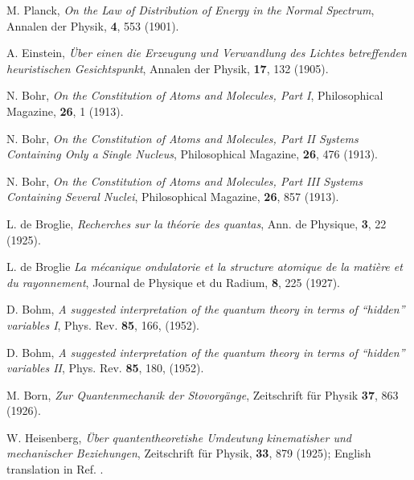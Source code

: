 \documentclass[onecolumn,nofootinbib, secnumarabic, amsmath, nobibnotes,11pt,aps,pra]{revtex4-1}
\begin{document}
\setcounter{enumiv}{0}
\begin{thebibliography}{999}

M. Planck, \emph{On the Law of Distribution of Energy in the Normal Spectrum}, Annalen der Physik, \textbf{4},   553 (1901).

A. Einstein, \emph{\"{U}ber einen die Erzeugung und Verwandlung des Lichtes betreffenden heuristischen Gesichtspunkt}, Annalen der Physik, \textbf{17},   132 (1905).

N. Bohr, \emph{On the Constitution of Atoms and Molecules, Part I}, Philosophical Magazine, \textbf{26},  1 (1913).

N. Bohr, \emph{On the Constitution of Atoms and Molecules, Part II Systems Containing Only a Single Nucleus}, Philosophical Magazine, \textbf{26},  476 (1913).

N. Bohr, \emph{On the Constitution of Atoms and Molecules, Part III Systems Containing Several Nuclei}, Philosophical Magazine, \textbf{26},  857 (1913).

L. de Broglie, \emph{Recherches sur la th\'{e}orie des quantas}, Ann. de Physique, \textbf{3},  22 (1925).

L. de Broglie \emph{La m\'{e}canique ondulatorie et la structure atomique de la mati\`ere et du rayonnement}, Journal de Physique et du Radium, \textbf{8},  225 (1927).

D. Bohm, \emph{A suggested interpretation of the quantum theory in terms of ``hidden'' variables  I}, Phys. Rev. {\bf 85},  166, (1952).

D. Bohm, \emph{A suggested interpretation of the quantum theory in terms of ``hidden'' variables  II}, Phys. Rev. {\bf 85},  180, (1952).

M. Born, \emph{Zur Quantenmechanik der Stovorg\"{a}nge}, Zeitschrift f\"{u}r Physik \textbf{37},  863 (1926).

W. Heisenberg, \emph{\"{U}ber quantentheoretishe Umdeutung kinematisher und mechanischer Beziehungen}, Zeitschrift f\"{u}r Physik, \textbf{33},  879 (1925); English translation in Ref. \cite{om.waerden}.


\end{thebibliography}
\end{document}
